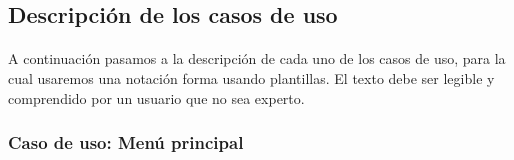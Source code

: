 \subsection{Descripción de los casos de uso}

\paragraph{}
A continuación pasamos a la descripción de cada uno de los casos de uso, para la cual usaremos una notación forma usando plantillas.
El texto debe ser legible y comprendido por un usuario que no sea experto.

\subsubsection{Caso de uso: Menú principal}

